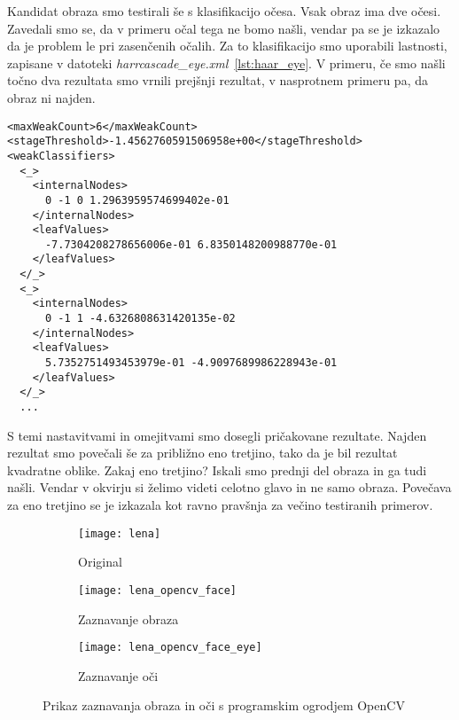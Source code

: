 Kandidat obraza smo testirali še s klasifikacijo očesa. Vsak obraz ima dve
očesi. Zavedali smo se, da v primeru očal tega ne bomo našli, vendar pa se je
izkazalo da je problem le pri zasenčenih očalih. Za to klasifikacijo smo
uporabili lastnosti, zapisane v datoteki
\textit{harrcascade\_eye.xml}~\ref{lst:haar_eye}. V primeru, če smo
našli točno dva rezultata smo vrnili prejšnji rezultat, v nasprotnem primeru
pa, da obraz ni najden.

\begin{lstlisting}[label=lst:haar_eye, caption=Izsek iz datoteke harrcascade\_eye.xml]
<maxWeakCount>6</maxWeakCount>
<stageThreshold>-1.4562760591506958e+00</stageThreshold>
<weakClassifiers>
  <_>
    <internalNodes>
      0 -1 0 1.2963959574699402e-01
    </internalNodes>
    <leafValues>
      -7.7304208278656006e-01 6.8350148200988770e-01
    </leafValues>
  </_>
  <_>
    <internalNodes>
      0 -1 1 -4.6326808631420135e-02
    </internalNodes>
    <leafValues>
      5.7352751493453979e-01 -4.9097689986228943e-01
    </leafValues>
  </_>
  ...
\end{lstlisting}

S temi nastavitvami in omejitvami smo dosegli pričakovane rezultate. Najden
rezultat smo povečali še za približno eno tretjino, tako da je bil rezultat
kvadratne oblike. Zakaj eno tretjino? Iskali smo prednji del obraza in ga tudi
našli. Vendar v okvirju si želimo videti celotno glavo in ne samo obraza.
Povečava za eno tretjino se je izkazala kot ravno pravšnja za večino
testiranih primerov.

\begin{figure}[!ht]
    \centering
    \begin{subfigure}[b]{0.3\textwidth}
        \texttt{[image: lena]}
        \caption{Original}
    \end{subfigure}
    \begin{subfigure}[b]{0.3\textwidth}
        \texttt{[image: lena\_opencv\_face]}
        \caption{Zaznavanje obraza}
        \label{fig:lena_opencv_face}
    \end{subfigure}
    \begin{subfigure}[b]{0.3\textwidth}
        \texttt{[image: lena\_opencv\_face\_eye]}
        \caption{Zaznavanje oči}
        \label{fig:lena_opencv_face_eye}
    \end{subfigure}
    \caption{Prikaz zaznavanja obraza in oči s programskim ogrodjem OpenCV}
\end{figure}

